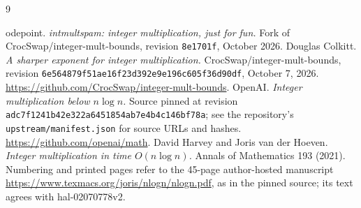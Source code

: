 \documentclass[11pt]{article}
\begin{document}
\begin{thebibliography}{9}
\raggedright
{} odepoint.
\emph{intmultspam: integer multiplication, just for fun.}
Fork of CrocSwap/integer-mult-bounds, revision \texttt{8e1701f}, October 2026.
 Douglas Colkitt.
\emph{A sharper exponent for integer multiplication.}
CrocSwap/integer-mult-bounds, revision
\texttt{6e564879f51ae16f23d392e9e196c605f36d90df}, October 7, 2026.
\url{https://github.com/CrocSwap/integer-mult-bounds}.
 OpenAI.
\emph{Integer multiplication below $n\log n$.}
Source pinned at revision
\texttt{adc7f1241b42e322a6451854ab7e4b4c146bf78a}; see the repository's
\texttt{upstream/manifest.json} for source URLs and hashes.
\url{https://github.com/openai/math}.
 David Harvey and Joris van der Hoeven.
\emph{Integer multiplication in time $O(n\log n)$.}
Annals of Mathematics 193 (2021). Numbering and printed pages refer to the
45-page author-hosted manuscript
\url{https://www.texmacs.org/joris/nlogn/nlogn.pdf}, as in the pinned
source; its text agrees with hal-02070778v2.
\end{thebibliography}
\end{document}
